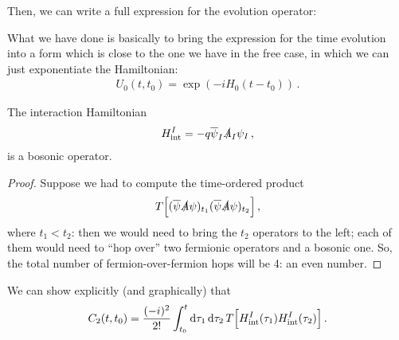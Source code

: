 \documentclass[main.tex]{subfiles}
\begin{document}
Then, we can write a full expression for the evolution operator: 
%

%

What we have done is basically to bring the expression for the time evolution into a form which is close to the one we have in the free case, in which we can just exponentiate the Hamiltonian: 
%
\begin{align}
U_0 (t, t_0 ) = \exp( - i H_0 (t - t_0 ))
\,.
\end{align}

\begin{claim}
The interaction Hamiltonian 
%
\begin{align}
H _{\text{int}}^{I} = - q \overline{\psi}_{I} \slashed{A}_{I} \psi_{I}
\,,
\end{align}
%
is a bosonic operator. 
\end{claim}

\begin{proof}
Suppose we had to compute the time-ordered product 
%
\begin{align}
T \qty[
(\overline{\psi}\slashed{A} \psi )_{t_1 }
(\overline{\psi}\slashed{A} \psi )_{t_2 }
]
\,,
\end{align}
%
where \(t_1 < t_2\): then we would need to bring the \(t_2 \) operators to the left; each of them would need to ``hop over'' two fermionic operators and a bosonic one. So, the total number of fermion-over-fermion hops will be 4: an even number.
\end{proof}

We can show explicitly (and graphically) that 
%
\begin{align}
C_2 (t, t_0 ) = \frac{(-i)^2}{2!} 
\int_{t_0 }^{t} \dd{\tau_1} \dd{\tau_2 } T \qty[H _{\text{int}}^{I}(\tau_1 ) H _{\text{int}}^{I} (\tau_2 )]
\,.
\end{align}
\end{document}
